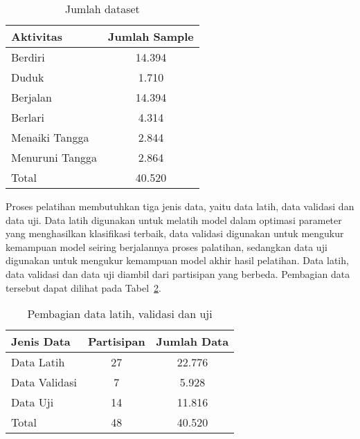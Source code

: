\begin{table}[h!]
    \centering
    \caption{Jumlah dataset}
    \begin{tabular}{ |l|c| }
        \hline
        \textbf{Aktivitas} & \textbf{Jumlah Sample} \\

        \hline
        Berdiri & 14.394 \\

        \hline
        Duduk & 1.710 \\

        \hline
        Berjalan & 14.394 \\

        \hline
        Berlari & 4.314 \\

        \hline
        Menaiki Tangga & 2.844 \\

        \hline
        Menuruni Tangga & 2.864 \\

        \hline
        Total & 40.520 \\

        \hline
    \end{tabular}
    \label{table:jumlah-dataset}
\end{table}

Proses pelatihan membutuhkan tiga jenis data, yaitu data latih, data validasi dan data uji. Data latih digunakan untuk melatih model dalam optimasi parameter yang menghasilkan klasifikasi terbaik, data validasi digunakan untuk mengukur kemampuan model seiring berjalannya proses palatihan, sedangkan data uji digunakan untuk mengukur kemampuan model akhir hasil pelatihan. Data latih, data validasi dan data uji diambil dari partisipan yang berbeda. Pembagian data tersebut dapat dilihat pada Tabel~\ref{table:pembagian-data}.

\begin{table}[h!]
    \centering
    \caption{Pembagian data latih, validasi dan uji}
    \begin{tabular}{ |l|c|c| }
        \hline
        Jenis Data & Partisipan & Jumlah Data \\

        \hline
        Data Latih & 27 & 22.776 \\

        \hline
        Data Validasi & 7 & 5.928 \\

        \hline
        Data Uji & 14 & 11.816 \\

        \hline
        Total & 48 & 40.520 \\

        \hline
    \end{tabular}
    \label{table:pembagian-data}
\end{table}


